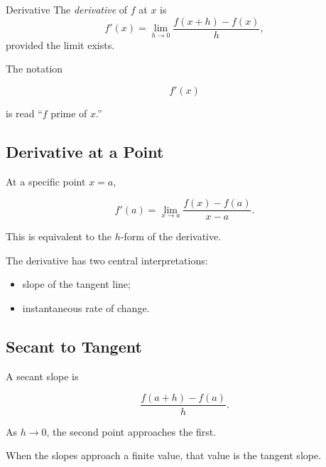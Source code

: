 \begin{definitionbox}{Derivative}
The \emph{derivative} of \(f\) at \(x\) is
\[ f'(x)=\lim_{h\to0}\frac{f(x+h)-f(x)}{h}, \]
provided the limit exists.
\end{definitionbox}

The notation

\[ f'(x) \]

is read ``\(f\) prime of \(x\).''

\subsection{Derivative at a Point}
\label{subsec:derivative-at-point}

At a specific point \(x=a\),

\[ f'(a)=\lim_{x\to a}\frac{f(x)-f(a)}{x-a}. \]

This is equivalent to the \(h\)-form of the derivative.

The derivative has two central interpretations:

\begin{itemize}
    \item slope of the tangent line;
    \item instantaneous rate of change.
\end{itemize}

\subsection{Secant to Tangent}
\label{subsec:secant-tangent-calculus}

A secant slope is

\[ \frac{f(a+h)-f(a)}{h}. \]

As \(h\to0\), the second point approaches the first.

When the slopes approach a finite value, that value is the tangent slope.

\begin{center}
\end{center}


